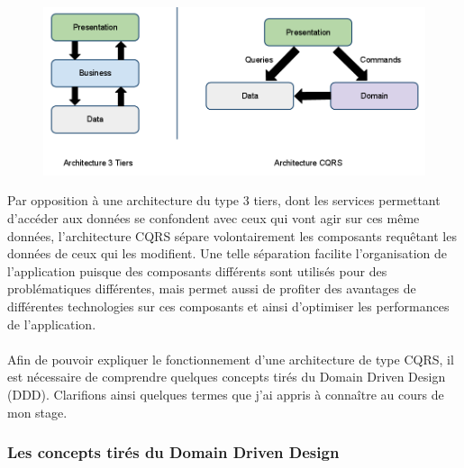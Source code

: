 \paragraph{}
\begin{figure}[h]
  \begin{center}
    \includegraphics[scale=0.4]{Figures/Chapter3/architecture/tiersvscqrs.png}
  \end{center}
\end{figure}
Par opposition à une architecture du type 3 tiers, dont les services permettant d'accéder aux données se confondent avec ceux qui vont agir sur ces même données, l'architecture CQRS sépare volontairement les composants requêtant les données de ceux qui les modifient.
Une telle séparation facilite l'organisation de l'application puisque des composants différents sont utilisés pour des problématiques différentes, mais permet aussi de profiter des avantages de différentes technologies sur ces composants et ainsi d'optimiser les performances de l'application.
\paragraph{}
Afin de pouvoir expliquer le fonctionnement d'une architecture de type CQRS, il est nécessaire de comprendre quelques concepts tirés du Domain Driven Design (DDD).
Clarifions ainsi quelques termes que j'ai appris à connaître au cours de mon stage.

\subsubsection{Les concepts tirés du Domain Driven Design}
\label{subs:Les concepts tirés du Domain Driven Design}

